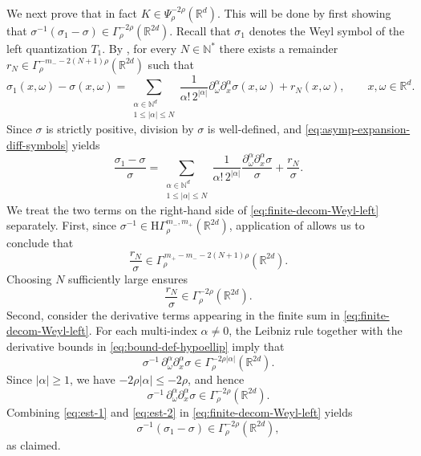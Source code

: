 \documentclass[a4paper,12pt]{article}
\newcommand{\N}{\mathbb{N}}
\newcommand{\R}{\mathbb{R}}
\newcommand{\hyposymbclass}{\text{H}\Gamma^{m_-,m_+}_\rho}
\begin{document}
We next prove that in fact $K\in\Psi^{-2\rho}_{\rho}(\R^d)$.
This will be done by first showing that $\sigma^{-1}(\sigma_1-\sigma)\in \Gamma^{-2\rho}_{\rho}(\R^{2d})$. 
Recall that $\sigma_1$ denotes the Weyl symbol of the left quantization $T_1$.
By \cite[Theorem~23.3]{shubin_pseudodifferential_2001}, for every $N\in\N^*$ there
exists a remainder
$r_N\in\Gamma^{-m_- - 2(N+1)\rho}_{\rho}(\R^{2d})$ such that
\begin{equation}\label{eq:asymp-expansion-diff-symbols}
    \sigma_1(x,\omega)-\sigma(x,\omega)
    =
    \sum_{\substack{\alpha\in\N^d\\1\le|\alpha|\le N}}
    \frac{1}{\alpha!\,2^{|\alpha|}}
    \partial_\omega^\alpha\partial_x^\alpha\sigma(x,\omega)
    + r_N(x,\omega),
    \qquad x,\omega\in\R^d.
\end{equation}
Since $\sigma$ is strictly positive, division by $\sigma$ is well-defined, and
\eqref{eq:asymp-expansion-diff-symbols} yields
\begin{equation}\label{eq:finite-decom-Weyl-left}
    \frac{\sigma_1-\sigma}{\sigma}
    =
    \sum_{\substack{\alpha\in\N^d\\1\le|\alpha|\le N}}
    \frac{1}{\alpha!\,2^{|\alpha|}}
    \frac{\partial_\omega^\alpha\partial_x^\alpha\sigma}{\sigma}
    + \frac{r_N}{\sigma}.
\end{equation}
We treat the two terms on the right-hand side of \eqref{eq:finite-decom-Weyl-left} separately.
First, since $\sigma^{-1}\in\hyposymbclass(\R^{2d})$, application of
\cite[Lemma~25.1]{shubin_pseudodifferential_2001} allows us to conclude that
\[
\frac{r_N}{\sigma}
\in
\Gamma^{\,m_+ - m_- - 2(N+1)\rho}_{\rho}(\R^{2d}).
\]
Choosing $N$ sufficiently large ensures
\begin{equation}\label{eq:est-1}
\frac{r_N}{\sigma}\in \Gamma^{-2\rho}_{\rho}(\R^{2d}).
\end{equation}
Second, consider the derivative terms appearing in the finite sum in
\eqref{eq:finite-decom-Weyl-left}. For each multi-index $\alpha\neq 0$, the
Leibniz rule together with the derivative bounds in
\eqref{eq:bound-def-hypoellip} imply that
\[
\sigma^{-1}\,\partial_\omega^\alpha\partial_x^\alpha\sigma
\in
\Gamma^{-2\rho|\alpha|}_{\rho}(\R^{2d}).
\]
Since $|\alpha|\ge 1$, we have $-2\rho|\alpha|\le -2\rho$, and hence
\begin{equation}\label{eq:est-2}
\sigma^{-1}\,\partial_\omega^\alpha\partial_x^\alpha\sigma
\in
\Gamma^{-2\rho}_{\rho}(\R^{2d}).
\end{equation}
Combining \eqref{eq:est-1} and \eqref{eq:est-2} in \eqref{eq:finite-decom-Weyl-left} yields
\[
\sigma^{-1}(\sigma_1-\sigma)\in \Gamma^{-2\rho}_{\rho}(\R^{2d}),
\]
as claimed.
\end{document}

